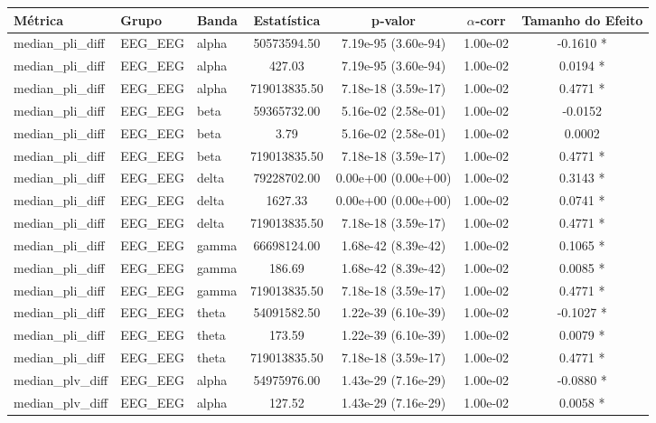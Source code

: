 \begin{tabular}{l l l c c c c}
    \toprule
    Métrica & Grupo & Banda & Estatística & p‑valor & $\alpha$‑corr & Tamanho do Efeito \\
    \midrule
    median\_pli\_diff & EEG\_EEG & alpha & 50573594.50 & 7.19e-95 (3.60e-94) & 1.00e-02 & -0.1610 * \\
    median\_pli\_diff & EEG\_EEG & alpha & 427.03 & 7.19e-95 (3.60e-94) & 1.00e-02 & 0.0194 * \\
    median\_pli\_diff & EEG\_EEG & alpha & 719013835.50 & 7.18e-18 (3.59e-17) & 1.00e-02 & 0.4771 * \\
    median\_pli\_diff & EEG\_EEG & beta & 59365732.00 & 5.16e-02 (2.58e-01) & 1.00e-02 & -0.0152  \\
    median\_pli\_diff & EEG\_EEG & beta & 3.79 & 5.16e-02 (2.58e-01) & 1.00e-02 & 0.0002  \\
    median\_pli\_diff & EEG\_EEG & beta & 719013835.50 & 7.18e-18 (3.59e-17) & 1.00e-02 & 0.4771 * \\
    median\_pli\_diff & EEG\_EEG & delta & 79228702.00 & 0.00e+00 (0.00e+00) & 1.00e-02 & 0.3143 * \\
    median\_pli\_diff & EEG\_EEG & delta & 1627.33 & 0.00e+00 (0.00e+00) & 1.00e-02 & 0.0741 * \\
    median\_pli\_diff & EEG\_EEG & delta & 719013835.50 & 7.18e-18 (3.59e-17) & 1.00e-02 & 0.4771 * \\
    median\_pli\_diff & EEG\_EEG & gamma & 66698124.00 & 1.68e-42 (8.39e-42) & 1.00e-02 & 0.1065 * \\
    median\_pli\_diff & EEG\_EEG & gamma & 186.69 & 1.68e-42 (8.39e-42) & 1.00e-02 & 0.0085 * \\
    median\_pli\_diff & EEG\_EEG & gamma & 719013835.50 & 7.18e-18 (3.59e-17) & 1.00e-02 & 0.4771 * \\
    median\_pli\_diff & EEG\_EEG & theta & 54091582.50 & 1.22e-39 (6.10e-39) & 1.00e-02 & -0.1027 * \\
    median\_pli\_diff & EEG\_EEG & theta & 173.59 & 1.22e-39 (6.10e-39) & 1.00e-02 & 0.0079 * \\
    median\_pli\_diff & EEG\_EEG & theta & 719013835.50 & 7.18e-18 (3.59e-17) & 1.00e-02 & 0.4771 * \\
    median\_plv\_diff & EEG\_EEG & alpha & 54975976.00 & 1.43e-29 (7.16e-29) & 1.00e-02 & -0.0880 * \\
    median\_plv\_diff & EEG\_EEG & alpha & 127.52 & 1.43e-29 (7.16e-29) & 1.00e-02 & 0.0058 * \\

\end{tabular}
